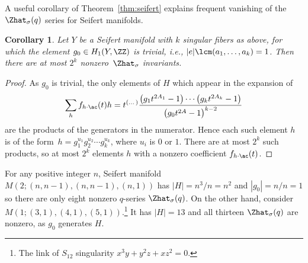 \documentclass[pdftex]{sigma}
\newtheorem{Corollary}[Theorem]{Corollary}
\begin{document}
A useful corollary of Theorem~\ref{thm:seifert} explains frequent vanishing of the $\Zhat_{\sigma}(q)$ series for Seifert manifolds.

\begin{Corollary}\label{cor:vanishing}
	Let $Y$ be a Seifert manifold with $k$ singular fibers as above, for which the element $g_0 \in H_1(Y,\ZZ)$ is trivial, i.e., $|e| \lcm(a_1,\dots,a_k) =1$. Then there are at most $2^k$ nonzero~$\Zhat_{\sigma}$ invariants.
\end{Corollary}

\begin{proof}
	As $g_0$ is trivial, the only elements of $H$ which appear in the expansion of
	\begin{equation}\label{seifert_equiv}
		\sum_h f_{h \cdot \ac}(t)h = t^{(\dots)}\frac{ \bigl(g_1 t^{2A_1}-1\bigr)\cdots\bigl(g_k t^{2A_k}-1\bigr)}{\bigl(g_0t^{2A}-1\bigr)^{k-2}}
	\end{equation}
	are the products of the generators in the numerator. Hence each such element $h$ is of the form~${
		h = g_1^{u_1} g_2^{u_2} \cdots g_k^{u_k}}$,
	where $u_i$ is $0$ or $1$. There are at most $2^k$ such products, so at most $2^k$ elements $h$ with a nonzero coefficient $f_{h \cdot \ac}(t)$.
\end{proof}

\begin{Example}
	For any positive integer $n$, Seifert manifold $M(2;(n, n-1), (n, n-1), (n, 1))$ has $|H| = n^3/n = n^2$ and $|g_0| = n/n = 1$ so there are only eight nonzero $q$-series $\Zhat_{\sigma} (q)$.
	On the other hand, consider $M(1;(3, 1), (4, 1), (5, 1))$.\footnote{The link of $S_{12}$ singularity $x^3y+y^2z+xz^2 = 0$.} It has $|H| = 13$ and all thirteen $\Zhat_{\sigma} (q)$ are nonzero, as $g_0$ generates $H$.
\end{Example}
\end{document}
